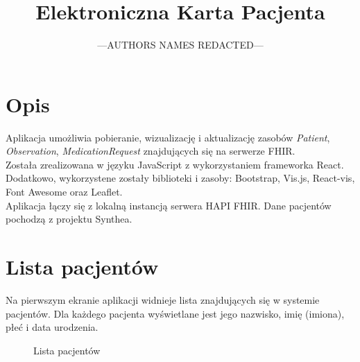 \documentclass[a4paper]{article}
\title{Elektroniczna Karta Pacjenta}
\author{---AUTHORS NAMES REDACTED---}
\date{}
\begin{document}
\maketitle

\section{Opis}
Aplikacja umożliwia pobieranie, wizualizację i aktualizację zasobów \textit{Patient}, \textit{Observation}, \textit{MedicationRequest}
znajdujących się na serwerze FHIR.
\\
Została zrealizowana w języku JavaScript z wykorzystaniem frameworka React.
Dodatkowo, wykorzystene zostały biblioteki i zasoby: Bootstrap, Vis.js, React-vis, Font Awesome oraz Leaflet.
\\
Aplikacja łączy się z lokalną instancją serwera HAPI FHIR. Dane pacjentów pochodzą z projektu Synthea.

\section{Lista pacjentów}
Na pierwszym ekranie aplikacji widnieje lista znajdujących się w systemie pacjentów.
Dla każdego pacjenta wyświetlane jest jego nazwisko, imię (imiona), płeć i data urodzenia.
\begin{figure}[H]
    \caption{Lista pacjentów}
\end{figure}

\pagebreak
\end{document}
